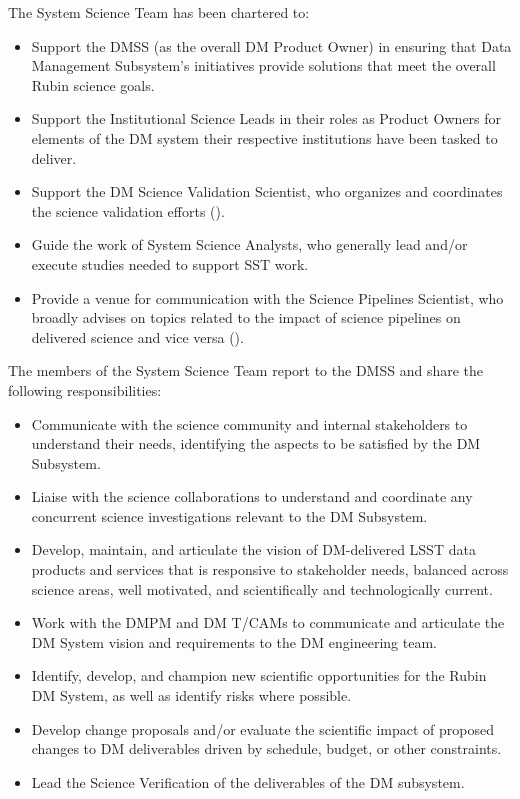 The System Science Team has been chartered to:
\begin{itemize}
\item Support the \gls{DMSS} (as the overall DM Product Owner) in ensuring that Data Management Subsystem's initiatives provide solutions that meet the overall Rubin science goals.
\item Support the Institutional Science Leads in their roles as Product Owners for elements of the DM system their respective institutions have been tasked to deliver.
\item Support the DM Science Validation Scientist, who organizes and coordinates the science validation efforts ().
\item Guide the work of System Science Analysts, who generally lead and/or execute studies needed to support SST work.
\item Provide a venue for communication with the Science Pipelines Scientist, who broadly advises on topics related to the impact of science pipelines on delivered science and vice versa ().
\end{itemize}

The members of the System Science Team report to the \gls{DMSS} and share the following responsibilities:
\begin{itemize}
\item Communicate with the science community and internal stakeholders to understand their needs, identifying the aspects to be satisfied by the DM Subsystem.
\item Liaise with the science collaborations to understand and coordinate any concurrent science investigations relevant to the DM Subsystem.
\item Develop, maintain, and articulate the vision of DM-delivered LSST data products and services that is responsive to stakeholder needs, balanced across science areas, well motivated, and scientifically and technologically current.
\item Work with the \gls{DMPM} and DM \glspl{T/CAM} to communicate and articulate the DM System vision and requirements to the DM engineering team.
\item Identify, develop, and champion new scientific opportunities for the Rubin DM System, as well as identify risks where possible.
\item Develop change proposals and/or evaluate the scientific impact of proposed changes to DM deliverables driven by schedule, budget, or other constraints.
\item Lead the Science Verification of the deliverables of the DM subsystem.
\end{itemize}

